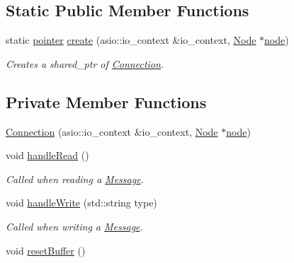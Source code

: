 \subsection*{Static Public Member Functions}
\begin{DoxyCompactItemize}
\item 
static \mbox{\hyperlink{classConnection_a1bb6cd8924ff091e9b053e3368735c9c}{pointer}} \mbox{\hyperlink{classConnection_a31f4b3c4ce970776f98b5fb20bdf3ef1}{create}} (asio\+::io\+\_\+context \&io\+\_\+context, \mbox{\hyperlink{classNode}{Node}} $\ast$\mbox{\hyperlink{classConnection_a0e90a6ef9361901f3d7c25e00d0a2016}{node}})
\begin{DoxyCompactList}\small\item\em Creates a shared\+\_\+ptr of \mbox{\hyperlink{classConnection}{Connection}}. \end{DoxyCompactList}\end{DoxyCompactItemize}
\subsection*{Private Member Functions}
\begin{DoxyCompactItemize}
\item 
\mbox{\hyperlink{classConnection_a0679a72f407a3c3fca0cea1cd2cd9eda}{Connection}} (asio\+::io\+\_\+context \&io\+\_\+context, \mbox{\hyperlink{classNode}{Node}} $\ast$\mbox{\hyperlink{classConnection_a0e90a6ef9361901f3d7c25e00d0a2016}{node}})
\item 
void \mbox{\hyperlink{classConnection_af084bfb2043337222d885cc8cc46201d}{handle\+Read}} ()
\begin{DoxyCompactList}\small\item\em Called when reading a \mbox{\hyperlink{classMessage}{Message}}. \end{DoxyCompactList}\item 
void \mbox{\hyperlink{classConnection_a0b08401c5769b84c2a2b4b99363925fa}{handle\+Write}} (std\+::string type)
\begin{DoxyCompactList}\small\item\em Called when writing a \mbox{\hyperlink{classMessage}{Message}}. \end{DoxyCompactList}\item 
void \mbox{\hyperlink{classConnection_a489def548f673328fe383c5625224367}{reset\+Buffer}} ()
\end{DoxyCompactItemize}
